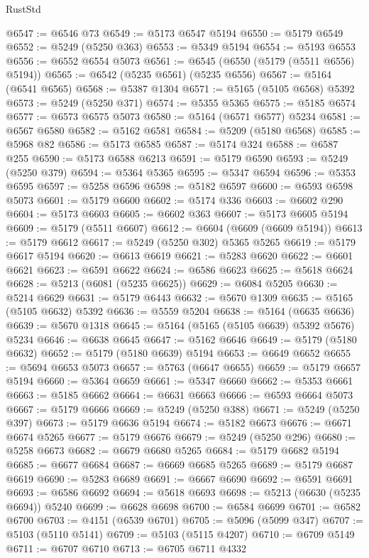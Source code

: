 \begin{lexlean}{RustStd}
\begin{coremodule}
@6547 := @6546 @73
@6549 := @5173 @6547 @5194
@6550 := @5179 @6549
@6552 := @5249 (@5250 @363)
@6553 := @5349 @5194
@6554 := @5193 @6553
@6556 := @6552 @6554 @5073
@6561 := @6545 (@6550 (@5179 (@5511 @6556) @5194))
@6565 := @6542 (@5235 @6561) (@5235 @6556)
@6567 := @5164 (@6541 @6565)
@6568 := @5387 @1304
@6571 := @5165 (@5105 @6568) @5392
@6573 := @5249 (@5250 @371)
@6574 := @5355 @5365
@6575 := @5185 @6574
@6577 := @6573 @6575 @5073
@6580 := @5164 (@6571 @6577) @5234
@6581 := @6567 @6580
@6582 := @5162 @6581
@6584 := @5209 (@5180 @6568)
@6585 := @5968 @82
@6586 := @5173 @6585
@6587 := @5174 @324
@6588 := @6587 @255
@6590 := @5173 @6588 @6213
@6591 := @5179 @6590
@6593 := @5249 (@5250 @379)
@6594 := @5364 @5365
@6595 := @5347 @6594
@6596 := @5353 @6595
@6597 := @5258 @6596
@6598 := @5182 @6597
@6600 := @6593 @6598 @5073
@6601 := @5179 @6600
@6602 := @5174 @336
@6603 := @6602 @290
@6604 := @5173 @6603
@6605 := @6602 @363
@6607 := @5173 @6605 @5194
@6609 := @5179 (@5511 @6607)
@6612 := @6604 (@6609 (@6609 @5194))
@6613 := @5179 @6612
@6617 := @5249 (@5250 @302) @5365 @5265
@6619 := @5179 @6617 @5194
@6620 := @6613 @6619
@6621 := @5283 @6620
@6622 := @6601 @6621
@6623 := @6591 @6622
@6624 := @6586 @6623
@6625 := @5618 @6624
@6628 := @5213 (@6081 (@5235 @6625))
@6629 := @6084 @5205
@6630 := @5214 @6629
@6631 := @5179 @6443
@6632 := @5670 @1309
@6635 := @5165 (@5105 @6632) @5392
@6636 := @5559 @5204
@6638 := @5164 (@6635 @6636)
@6639 := @5670 @1318
@6645 := @5164 (@5165 (@5105 @6639) @5392 @5676) @5234
@6646 := @6638 @6645
@6647 := @5162 @6646
@6649 := @5179 (@5180 @6632)
@6652 := @5179 (@5180 @6639) @5194
@6653 := @6649 @6652
@6655 := @5694 @6653 @5073
@6657 := @5763 (@6647 @6655)
@6659 := @5179 @6657 @5194
@6660 := @5364 @6659
@6661 := @5347 @6660
@6662 := @5353 @6661
@6663 := @5185 @6662
@6664 := @6631 @6663
@6666 := @6593 @6664 @5073
@6667 := @5179 @6666
@6669 := @5249 (@5250 @388)
@6671 := @5249 (@5250 @397)
@6673 := @5179 @6636 @5194
@6674 := @5182 @6673
@6676 := @6671 @6674 @5265
@6677 := @5179 @6676
@6679 := @5249 (@5250 @296)
@6680 := @5258 @6673
@6682 := @6679 @6680 @5265
@6684 := @5179 @6682 @5194
@6685 := @6677 @6684
@6687 := @6669 @6685 @5265
@6689 := @5179 @6687 @6619
@6690 := @5283 @6689
@6691 := @6667 @6690
@6692 := @6591 @6691
@6693 := @6586 @6692
@6694 := @5618 @6693
@6698 := @5213 (@6630 (@5235 @6694)) @5240
@6699 := @6628 @6698
@6700 := @6584 @6699
@6701 := @6582 @6700
@6703 := @4151 (@6539 @6701)
@6705 := @5096 (@5099 @347)
@6707 := @5103 (@5110 @5141)
@6709 := @5103 (@5115 @4207)
@6710 := @6709 @5149
@6711 := @6707 @6710
@6713 := @6705 @6711 @4332

\end{coremodule}
\end{lexlean}
